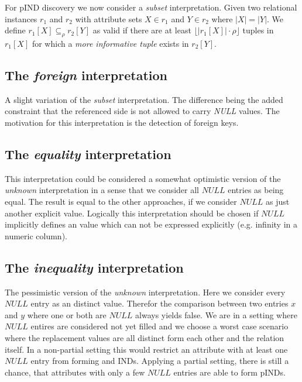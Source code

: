 For pIND discovery we now consider a \textit{subset} interpretation. Given two relational instances $r_1$ and $r_2$ with attribute sets
$X \in r_1$ and $Y \in r_2$ where $|X| = |Y|$. We define $r_1[X] \subseteq_\rho r_2[Y]$ as valid if there are at least $\lfloor |r_1[X]| \cdot \rho \rfloor$
tuples in $r_1[X]$ for which a \textit{more informative tuple} exists in $r_2[Y]$.

\subsection*{The \textit{foreign} interpretation}
A slight variation of the \textit{subset} interpretation. The difference being the added constraint that the referenced side is not allowed to
carry \textit{NULL} values. The motivation for this interpretation is the detection of foreign keys.

\subsection*{The \textit{equality} interpretation}
This interpretation could be considered a somewhat optimistic version of the \textit{unknown} interpretation in a sense that we consider all $NULL$ entries as being equal.
The result is equal to the other approaches, if we consider $NULL$ as just another explicit value.
Logically this interpretation should be chosen if $NULL$ implicitly defines an value which can not be expressed explicitly (e.g. infinity in a numeric column).

\subsection*{The \textit{inequality} interpretation}
The pessimistic version of the \textit{unknown} interpretation. Here we consider every $NULL$ entry as an distinct value.
Therefor the comparison between two entries $x$ and $y$ where one or both are $NULL$ always yields false.
We are in a setting where $NULL$ entires are considered not yet filled and we choose a worst case scenario where the
replacement values are all distinct form each other and the relation itself.
In a non-partial setting this would restrict an attribute with at least one $NULL$ entry from forming and INDs. Applying
a partial setting, there is still a chance, that attributes with only a few $NULL$ entries are able to form pINDs.